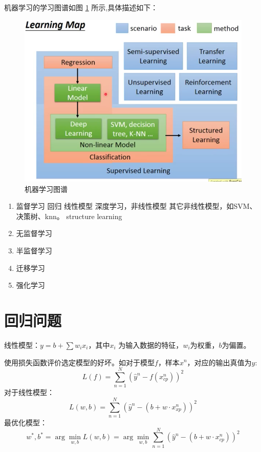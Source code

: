 \documentclass[UTF8]{ctexbook}
\begin{document}
机器学习的学习图谱如图 \ref{fig:ml_map} 所示,具体描述如下：

\begin{figure}[ht]
	\centering
	\includegraphics[scale=0.4]{./pic/learning_map.png}
	\caption{机器学习图谱}
	\label{fig:ml_map}
\end{figure}
	
\begin{enumerate}
	\item 监督学习
		\subitem 回归
		\subitem 线性模型
		\subitem 深度学习，非线性模型
		\subitem 其它非线性模型，如SVM、决策树、knn。
		\subitem structure learning
	\item 无监督学习
	\item 半监督学习
	\item 迁移学习
	\item 强化学习

\end{enumerate}

\section{回归问题}
线性模型：$y=b+\sum w_i x_i$，其中$x_i$ 为输入数据的特征，$w_i$为权重，$b$为偏置。

使用损失函数评价选定模型的好坏。如对于模型$f$，样本$x^n$，对应的输出真值为$\hat{y}$:
\[
	L(f)=\sum_{n=1}^{N}\left( \hat{y}^n - f(x_{cp}^n) \right)^2
\]
对于线性模型：
\[
	L(w,b)=\sum_{n=1}^{N}\left( \hat{y}^n - (b+w \cdot x_{xp}^n) \right)^2
\]
最优化模型：
\[
	w ^ { * } , b ^ { * } = \arg \min _ { w , b } L ( w , b )= \arg \min _ { w , b } \sum _ { n = 1 } ^ { N } \left( \hat { y } ^ { n } - ( b + w \cdot x _ { c p } ^ { n } ) \right) ^ { 2 }
\]
\end{document}
